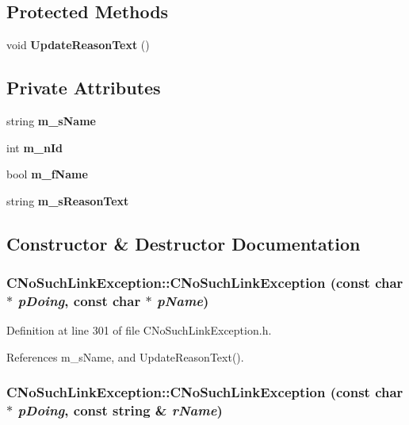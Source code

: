 \subsection*{Protected Methods}
\begin{CompactItemize}
\item 
void {\bf Update\-Reason\-Text} ()
\end{CompactItemize}
\subsection*{Private Attributes}
\begin{CompactItemize}
\item 
string {\bf m\_\-s\-Name}
\item 
int {\bf m\_\-n\-Id}
\item 
bool {\bf m\_\-f\-Name}
\item 
string {\bf m\_\-s\-Reason\-Text}
\end{CompactItemize}


\subsection{Constructor \& Destructor Documentation}
\subsubsection{\setlength{\rightskip}{0pt plus 5cm}CNo\-Such\-Link\-Exception::CNo\-Such\-Link\-Exception (const char $\ast$ {\em p\-Doing}, const char $\ast$ {\em p\-Name})\hspace{0.3cm}{\tt  [inline]}}\label{classCNoSuchLinkException_a0}




Definition at line 301 of file CNo\-Such\-Link\-Exception.h.

References m\_\-s\-Name, and Update\-Reason\-Text().
\subsubsection{\setlength{\rightskip}{0pt plus 5cm}CNo\-Such\-Link\-Exception::CNo\-Such\-Link\-Exception (const char $\ast$ {\em p\-Doing}, const string \& {\em r\-Name})\hspace{0.3cm}{\tt  [inline]}}\label{classCNoSuchLinkException_a1}




